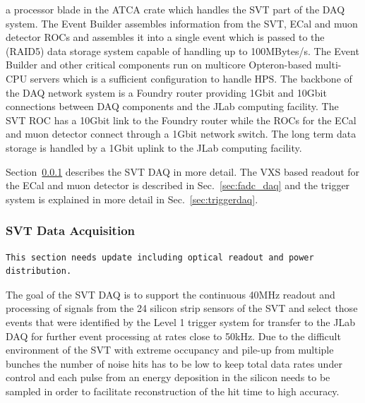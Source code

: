 a processor blade in the ATCA crate which handles the SVT part of the DAQ system. 
The Event Builder assembles 
information from the SVT, ECal and muon detector ROCs and assembles it into a single 
event which is passed to the (RAID5) data storage system capable of handling up to 
100MBytes/s. The Event Builder and other 
critical components run on multicore Opteron-based multi-CPU servers which is a 
sufficient configuration to handle HPS. The backbone of the DAQ network system is a 
Foundry router providing 1Gbit and 10Gbit connections between DAQ components and 
the JLab computing facility. The SVT ROC has a 10Gbit link to the Foundry router while the 
ROCs for the ECal and muon detector connect through a 1Gbit network switch. The long 
term data storage is handled by a 1Gbit uplink to the JLab computing facility. 

Section~\ref{sec:svt_daq} describes the SVT DAQ in more detail. The VXS based readout for 
the ECal and muon detector is described in Sec.~\ref{sec:fadc_daq} and the trigger 
system is explained in more detail in Sec.~\ref{sec:triggerdaq}.

\subsubsection{SVT Data Acquisition}
\label{sec:svt_daq}

\begin{verbatim}
This section needs update including optical readout and power distribution.
\end{verbatim}


The goal of the SVT DAQ is to support the continuous 40MHz readout and processing of signals from 
the 24 silicon strip sensors of the SVT and select those events that were identified by the 
Level 1 trigger system for transfer to the JLab DAQ for further event processing at rates 
close to 50kHz. 
Due to the difficult environment of the SVT with extreme occupancy and pile-up from multiple bunches  the number of noise hits has to be low to keep total data rates under control and 
each pulse from an energy deposition in the silicon needs to be sampled in order to facilitate 
reconstruction of the hit time to high accuracy. 

